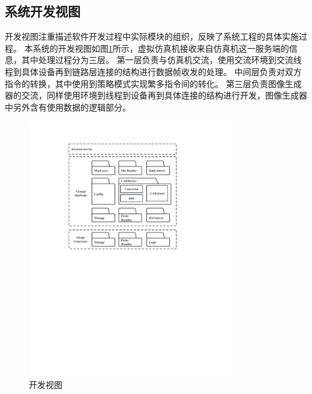 \subsection{系统开发视图}
开发视图注重描述软件开发过程中实际模块的组织，反映了系统工程的具体实施过程。
本系统的开发视图如图\ref{dev}所示，虚拟仿真机接收来自仿真机这一服务端的信息，其中处理过程分为三层。
第一层负责与仿真机交流，使用交流环境到交流线程到具体设备再到链路层连接的结构进行数据帧收发的处理。
中间层负责对双方指令的转换，其中使用到策略模式实现繁多指令间的转化。
第三层负责图像生成器的交流，同样使用环境到线程到设备再到具体连接的结构进行开发，图像生成器中另外含有使用数据的逻辑部分。
\begin{figure}[h]
    \begin{center}
        \includegraphics[width=0.8\textwidth]{pictures/devdiagram.pdf}
        \caption{开发视图}
        \label{dev}
    \end{center}
\end{figure}
